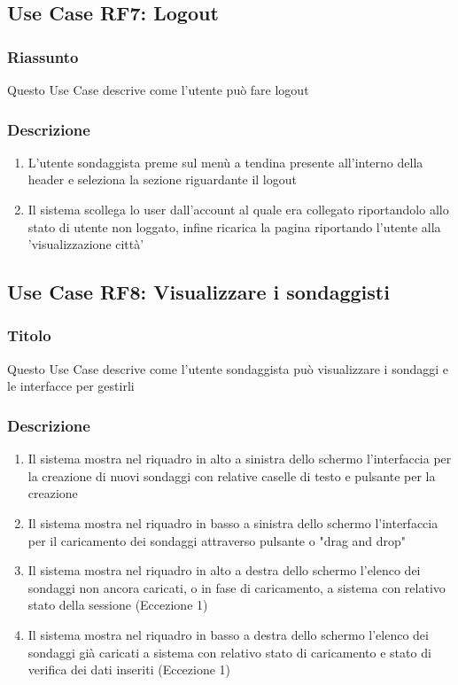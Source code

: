     \subsection{Use Case RF7: Logout}
        \subsubsection{Riassunto}
            Questo Use Case descrive come l'utente può fare logout
        \subsubsection{Descrizione}
            \begin{enumerate}
                \item L'utente sondaggista preme sul menù a tendina presente all'interno della header e seleziona la sezione riguardante il logout
                \item Il sistema scollega lo user dall'account al quale era collegato riportandolo allo stato di utente non loggato, infine 
                ricarica la pagina riportando l'utente alla 'visualizzazione città'
            \end{enumerate}

    \subsection{Use Case RF8: Visualizzare i sondaggisti}
        \subsubsection{Titolo}
            Questo Use Case descrive come l'utente sondaggista può visualizzare i sondaggi e le interfacce per gestirli
        \subsubsection{Descrizione}
            \begin{enumerate}
                \item Il sistema mostra nel riquadro in alto a sinistra dello schermo l'interfaccia per la creazione di nuovi sondaggi con relative caselle di testo e pulsante per la creazione
                \item Il sistema mostra nel riquadro in basso a sinistra dello schermo l'interfaccia per il caricamento dei sondaggi attraverso pulsante o "drag and drop"
                \item Il sistema mostra nel riquadro in alto a destra dello schermo l'elenco dei sondaggi non ancora caricati, o in fase di caricamento, a sistema con relativo stato della sessione (Eccezione 1)
                \item Il sistema mostra nel riquadro in basso a destra dello schermo l'elenco dei sondaggi già caricati a sistema con relativo stato di caricamento e stato di verifica dei dati inseriti (Eccezione 1)
            \end{enumerate}
